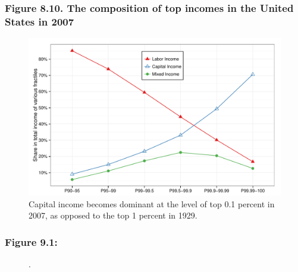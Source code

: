 \documentclass[t]{beamer}\usepackage[]{graphicx}\usepackage[]{color}
\newenvironment{knitrout}{}{} %
\begin{document}
\begin{frame}[label=Figure_8_10,fragile]
\frametitle{Figure 8.10. The composition of top incomes in the United States in 2007}
\begin{figure}[t]
\begin{minipage}[b]{\textwidth}
\centering
\begin{knitrout}\footnotesize
{}\color{fgcolor}

{\centering \includegraphics[width=1\linewidth]{figures/color/Figure_8_10} 

}



\end{knitrout}
\caption{Capital income becomes dominant at the level of top 0.1 percent in 2007, as opposed to the top 1 percent in 1929.}
\end{minipage}
\end{figure}
\end{frame}


\begin{frame}[label=Figure_9_1]
\frametitle{Figure 9.1: }
\begin{figure}[t]
\begin{minipage}[b]{\textwidth}
\centering

\caption{.}
\end{minipage}
\end{figure}
\end{frame}
\end{document}

